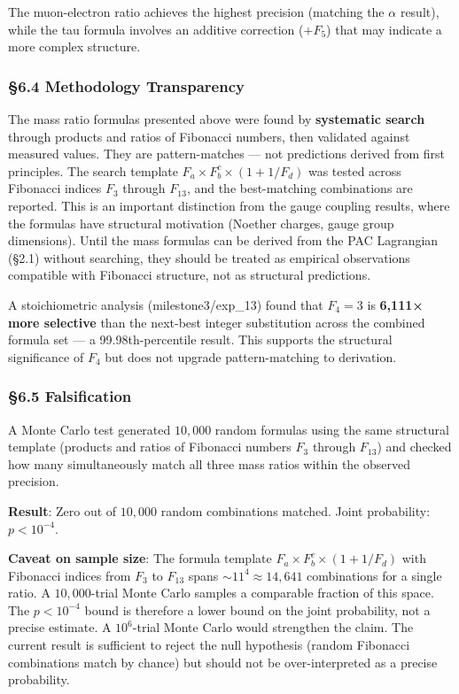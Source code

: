 \documentclass[
  11pt,
  a4paper]{article}
\begin{document}
The muon-electron ratio achieves the highest precision (matching the
\(\alpha\) result), while the tau formula involves an additive
correction (\(+ F_5\)) that may indicate a more complex structure.

\subsubsection{§6.4 Methodology
Transparency}\label{methodology-transparency}

The mass ratio formulas presented above were found by \textbf{systematic
search} through products and ratios of Fibonacci numbers, then validated
against measured values. They are pattern-matches --- not predictions
derived from first principles. The search template
\(F_a \times F_b^c \times (1 + 1/F_d)\) was tested across Fibonacci
indices \(F_3\) through \(F_{13}\), and the best-matching combinations
are reported. This is an important distinction from the gauge coupling
results, where the formulas have structural motivation (Noether charges,
gauge group dimensions). Until the mass formulas can be derived from the
PAC Lagrangian (§2.1) without searching, they should be treated as
empirical observations compatible with Fibonacci structure, not as
structural predictions.

A stoichiometric analysis (milestone3/exp\_13) found that \(F_4 = 3\) is
\textbf{6,111× more selective} than the next-best integer substitution
across the combined formula set --- a 99.98th-percentile result. This
supports the structural significance of \(F_4\) but does not upgrade
pattern-matching to derivation.

\subsubsection{§6.5 Falsification}\label{falsification}

A Monte Carlo test generated \(10{,}000\) random formulas using the same
structural template (products and ratios of Fibonacci numbers \(F_3\)
through \(F_{13}\)) and checked how many simultaneously match all three
mass ratios within the observed precision.

\textbf{Result}: Zero out of \(10{,}000\) random combinations matched.
Joint probability: \(p < 10^{-4}\).

\textbf{Caveat on sample size}: The formula template
\(F_a \times F_b^c \times (1 + 1/F_d)\) with Fibonacci indices from
\(F_3\) to \(F_{13}\) spans \(\sim 11^4 \approx 14{,}641\) combinations
for a single ratio. A \(10{,}000\)-trial Monte Carlo samples a
comparable fraction of this space. The \(p < 10^{-4}\) bound is
therefore a lower bound on the joint probability, not a precise
estimate. A \(10^6\)-trial Monte Carlo would strengthen the claim. The
current result is sufficient to reject the null hypothesis (random
Fibonacci combinations match by chance) but should not be
over-interpreted as a precise probability.
\end{document}
